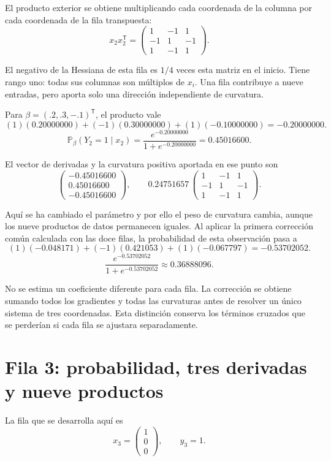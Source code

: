\documentclass[11pt,a4paper]{article}
\newcommand{\Prob}{\mathbb P}
\newcommand{\T}{^{\mathsf T}}
\begin{document}
El producto exterior se obtiene multiplicando cada coordenada
de la columna por cada coordenada de la fila transpuesta:
\[
x_{2}x_{2}\T=\begin{pmatrix}1&-1&1\\-1&1&-1\\1&-1&1\end{pmatrix}.
\]

El negativo de la Hessiana de esta fila es \(1/4\)
veces esta matriz en el inicio. Tiene rango uno:
todas sus columnas son múltiplos de \(x_i\).
Una fila contribuye a nueve entradas, pero aporta
solo una dirección independiente de curvatura.

Para \(\beta=(.2,.3,-.1)\T\), el producto vale
\[
(1)(0.20000000)+(-1)(0.30000000)+(1)(-0.10000000)=-0.20000000.
\]
\[
\Prob_\beta(Y_{2}=1\mid x_{2})=\frac{e^{-0.20000000}}{1+e^{-0.20000000}}=0.45016600.
\]

El vector de derivadas y la curvatura positiva aportada
en ese punto son
\[
\begin{pmatrix}-0.45016600\\0.45016600\\-0.45016600\end{pmatrix},\qquad 0.24751657\,\begin{pmatrix}1&-1&1\\-1&1&-1\\1&-1&1\end{pmatrix}.
\]

Aquí se ha cambiado el parámetro y por ello el peso de
curvatura cambia, aunque los nueve productos de datos
permanecen iguales.
Al aplicar la primera corrección común calculada con las doce filas,
la probabilidad de esta observación pasa a
\[
(1)(-0.048171)+(-1)(0.421053)+(1)(-0.067797)=-0.53702052.
\]
\[
\frac{e^{-0.53702052}}{1+e^{-0.53702052}}\approx0.36888096.
\]

No se estima un coeficiente diferente para cada fila.
La corrección se obtiene sumando todos los gradientes y todas
las curvaturas antes de resolver un único sistema de tres coordenadas.
Esta distinción conserva los términos cruzados que se perderían
si cada fila se ajustara separadamente.

\clearpage
\section{Fila 3: probabilidad, tres derivadas y nueve productos}\label{logit85}
La fila que se desarrolla aquí es
\[
x_{3}=\begin{pmatrix}1\\0\\0\end{pmatrix},\qquad y_{3}=1.
\]
\end{document}
